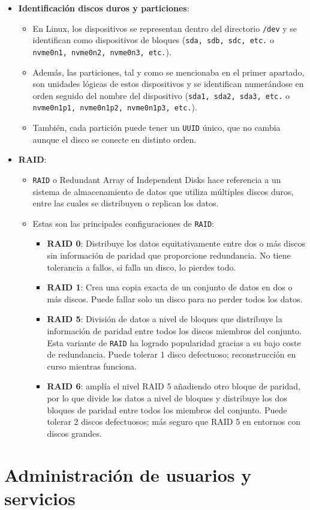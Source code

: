 \documentclass[10pt]{article}
\begin{document}
\begin{itemize}
\begin{itemize}
		\end{itemize}
		\item \textbf{Identificación discos duros y particiones}:
		\begin{itemize}
			\item En Linux, los dispositivos se representan dentro del directorio \verb|/dev| y se identifican como dispositivos de bloques (\verb|sda, sdb, sdc, etc.| o \verb|nvme0n1, nvme0n2, nvme0n3, etc.|).
			\item Además, las particiones, tal y como se mencionaba en el primer apartado, son unidades lógicas de estos dispositivos y se identifican numerándose en orden seguido del nombre del dispositivo (\verb|sda1, sda2, sda3, etc.| o \verb|nvme0n1p1, nvme0n1p2, nvme0n1p3, etc.|).\cite{Discos}
			\item También, cada partición puede tener un \verb|UUID| único, que no cambia aunque el disco se conecte en distinto orden.
		\end{itemize}
		\item \textbf{RAID}: 
		\begin{itemize}
			\item \verb|RAID| o Redundant Array of Independent Disks hace referencia a un sistema de almacenamiento de datos que utiliza múltiples discos duros, entre las cuales se distribuyen o replican los datos. \cite{RAID}
			\item Estas son las principales configuraciones de \verb|RAID|:
			\begin{itemize}
				\item \textbf{RAID 0}: Distribuye los datos equitativamente entre dos o más discos sin información de paridad que proporcione redundancia. No tiene tolerancia a fallos, si falla un disco, lo pierdes todo.
				\item \textbf{RAID 1}: Crea una copia exacta de un conjunto de datos en dos o más discos. Puede fallar solo un disco para no perder todos los datos.
				\item \textbf{RAID 5}: División de datos a nivel de bloques que distribuye la información de paridad entre todos los discos miembros del conjunto. Esta variante de \verb|RAID| ha logrado popularidad gracias a su bajo coste de redundancia. Puede tolerar 1 disco defectuoso; reconstrucción en curso mientras funciona.
				\item \textbf{RAID 6}: amplía el nivel RAID 5 añadiendo otro bloque de paridad, por lo que divide los datos a nivel de bloques y distribuye los dos bloques de paridad entre todos los miembros del conjunto. Puede tolerar 2 discos defectuosos; más seguro que RAID 5 en entornos con discos grandes.
			\end{itemize}
		\end{itemize}
	\end{itemize}
	
	\clearpage
	
	\section{Administración de usuarios y servicios}
	
	
	\clearpage
	
	
	
\end{document}
